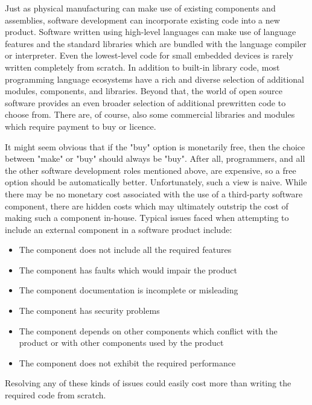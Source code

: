 Just as physical manufacturing can make use of existing components and assemblies, software development can incorporate existing code into a new product. Software written using high-level languages can make use of language features and the standard libraries which are bundled with the language compiler or interpreter. Even the lowest-level code for small embedded devices is rarely written completely from scratch. In addition to built-in library code, most programming language ecosystems have a rich and diverse selection of additional modules, components, and libraries. Beyond that, the world of open source software provides an even broader selection of additional prewritten code to choose from. There are, of course, also some commercial libraries and modules which require payment to buy or licence.

It might seem obvious that if the "buy" option is monetarily free, then the choice between "make" or "buy" should always be "buy". After all, programmers, and all the other software development roles mentioned above, are expensive, so a free option should be automatically better. Unfortunately, such a view is naive. While there may be no monetary cost associated with the use of a third-party software component, there are hidden costs which may ultimately outstrip the cost of making such a component in-house. Typical issues faced when attempting to include an external component in a software product include:

\begin{itemize}
    \item The component does not include all the required features
    \item The component has faults which would impair the product
    \item The component documentation is incomplete or misleading
    \item The component has security problems
    \item The component depends on other components which conflict with the product or with other components used by the product
    \item The component does not exhibit the required performance
\end{itemize}

Resolving any of these kinds of issues could easily cost more than writing the required code from scratch.

